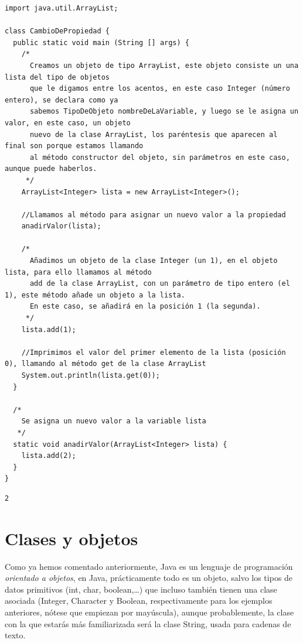 \documentclass[11pt]{article}
\begin{document}
\begin{verbatim}
import java.util.ArrayList;

class CambioDePropiedad {
  public static void main (String [] args) {
    /*
      Creamos un objeto de tipo ArrayList, este objeto consiste un una lista del tipo de objetos
      que le digamos entre los acentos, en este caso Integer (número entero), se declara como ya
      sabemos TipoDeObjeto nombreDeLaVariable, y luego se le asigna un valor, en este caso, un objeto
      nuevo de la clase ArrayList, los paréntesis que aparecen al final son porque estamos llamando
      al método constructor del objeto, sin parámetros en este caso, aunque puede haberlos.
     */
    ArrayList<Integer> lista = new ArrayList<Integer>();

    //Llamamos al método para asignar un nuevo valor a la propiedad
    anadirValor(lista);

    /*
      Añadimos un objeto de la clase Integer (un 1), en el objeto lista, para ello llamamos al método
      add de la clase ArrayList, con un parámetro de tipo entero (el 1), este método añade un objeto a la lista.
      En este caso, se añadirá en la posición 1 (la segunda).
     */
    lista.add(1);

    //Imprimimos el valor del primer elemento de la lista (posición 0), llamando al método get de la clase ArrayList
    System.out.println(lista.get(0));
  }

  /*
    Se asigna un nuevo valor a la variable lista
   */
  static void anadirValor(ArrayList<Integer> lista) {
    lista.add(2);
  }
}
\end{verbatim}

\begin{verbatim}
2
\end{verbatim}

\section{Clases y objetos}
\label{sec:orga9ebf42}
Como ya hemos comentado anteriormente, Java es un lenguaje de programación \emph{orientado a objetos}, en Java, prácticamente todo es un objeto, salvo los tipos de datos primitivos (int, char, boolean,\ldots{}) que incluso también tienen una clase asociada (Integer, Character y Boolean, respectivamente para los ejemplos anteriores, nótese que empiezan por mayúscula), aunque probablemente, la clase con la que estarás más familiarizada será la clase String, usada para cadenas de texto.
\end{document}
